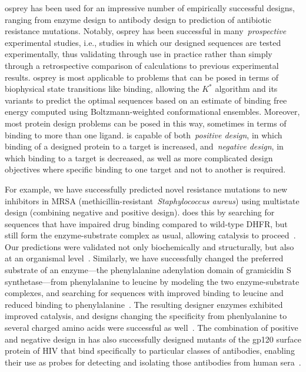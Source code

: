 
{\sc osprey} has been used for an impressive number of empirically successful designs, ranging from enzyme design to antibody design to prediction of antibiotic resistance mutations.  Notably, {\sc osprey} has been successful in many~\textit{prospective} experimental studies, i.e., studies in which our designed sequences are tested experimentally, thus validating \osprey through use in practice rather than simply through a retrospective comparison of \osprey calculations to previous experimental results.  {\sc osprey} is most applicable to problems that can be posed in terms of biophysical state transitions like binding, allowing the $K^*$ algorithm and its variants to predict the optimal sequences based on an estimate of binding free energy computed using Boltzmann-weighted conformational ensembles.  Moreover, most protein design problems can be posed in this way, sometimes in terms of binding to more than one ligand.  \osprey is capable of both~\textit{positive design}, in which binding of a designed protein to a target is increased, and~\textit{negative design}, in which binding to a target is decreased, as well as more complicated design objectives where specific binding to one target and not to another is required.  

For example, we have successfully predicted novel resistance mutations to new inhibitors in MRSA (methicillin-resistant~\textit{Staphylococcus aureus}) using multistate design (combining negative and positive design).  \osprey does this by searching for sequences that have impaired drug binding compared to wild-type DHFR, but still form the enzyme-substrate complex as usual, allowing catalysis to proceed~\cite{DHFR-PNAS,DHFR-PNAS2}.  Our predictions were validated not only biochemically and structurally, but also at an organismal level~\cite{DHFR-PNAS2, mimb_resistance, DHFR_hospitals}.  Similarly, we have successfully changed the preferred substrate of an enzyme---the phenylalanine adenylation domain of gramicidin S synthetase---from phenylalanine to leucine by modeling the two enzyme-substrate complexes, and searching for sequences with improved binding to leucine and reduced binding to phenylalanine~\cite{GrsA-LeuA}.  The resulting designer enzymes exhibited improved catalysis, and designs changing the specificity from phenlyalanine to several charged amino acids were successful as well~\cite{GrsA-LeuA}.  The combination of positive and negative design in \osprey has also successfully designed mutants of the gp120 surface protein of HIV that bind specifically to particular classes of antibodies, enabling their use as probes for detecting and isolating those antibodies from human sera~\cite{specific_probes}.  

